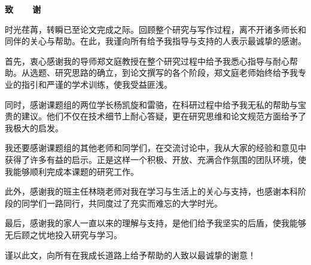 \cleardoublepage{}
\vspace*{-2em}
\begin{center}
    \bfseries {} 致~~~~谢
\end{center}

时光荏苒，转瞬已至论文完成之际。回顾整个研究与写作过程，离不开诸多师长和同伴的关心与帮助。在此，我谨向所有给予我指导与支持的人表示最诚挚的感谢。

首先，衷心感谢我的导师郑文庭教授在整个研究过程中给予我悉心指导与耐心帮助。从选题、研究思路的确立，到论文撰写的各个阶段，郑文庭老师始终给予我专业的指引和严谨的学术训练，使我受益匪浅。

同时，感谢课题组的两位学长杨凯旋和雷骆，在科研过程中给予我无私的帮助与宝贵的建议。他们不仅在技术细节上耐心答疑，更在研究思维和论文规范方面给予了我极大的启发。

我还要感谢课题组的其他老师和同学们，在交流讨论中，我从大家的经验和意见中获得了许多有益的启示。正是这样一个积极、开放、充满合作氛围的团队环境，使我能够顺利完成本课题的研究工作。

此外，感谢我的班主任林晓老师对我在学习与生活上的关心与支持，也感谢本科阶段的同学们一路同行，共同度过了充实而难忘的大学时光。

最后，感谢我的家人一直以来的理解与支持，是他们给予我坚实的后盾，使我能够无后顾之忧地投入研究与学习。

谨以此文，向所有在我成长道路上给予帮助的人致以最诚挚的谢意！